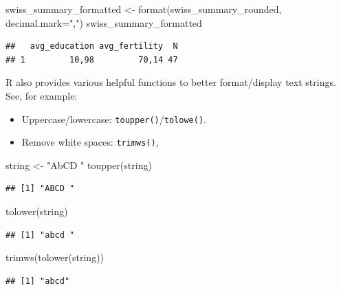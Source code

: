 \documentclass[
  12pt,
]{style/krantz}
\newenvironment{Shaded}{\begin{snugshade}}{\end{snugshade}}
\newcommand{\AttributeTok}[1]{\textcolor[rgb]{0.77,0.63,0.00}{#1}}
\newcommand{\FunctionTok}[1]{\textcolor[rgb]{0.00,0.00,0.00}{#1}}
\newcommand{\NormalTok}[1]{#1}
\newcommand{\OtherTok}[1]{\textcolor[rgb]{0.56,0.35,0.01}{#1}}
\newcommand{\StringTok}[1]{\textcolor[rgb]{0.31,0.60,0.02}{#1}}
\providecommand{\tightlist}{%
  \setlength{\itemsep}{0pt}\setlength{\parskip}{0pt}}
\begin{document}
\begin{Shaded}
\begin{Highlighting}[]
\NormalTok{swiss\_summary\_formatted }\OtherTok{\textless{}{-}} \FunctionTok{format}\NormalTok{(swiss\_summary\_rounded, }\AttributeTok{decimal.mark=}\StringTok{","}\NormalTok{)}
\NormalTok{swiss\_summary\_formatted }
\end{Highlighting}
\end{Shaded}

\begin{verbatim}
##   avg_education avg_fertility  N
## 1         10,98         70,14 47
\end{verbatim}

R also provides various helpful functions to better format/display text strings. See, for example:

\begin{itemize}
\tightlist
\item
  Uppercase/lowercase: \texttt{toupper()}/\texttt{tolowe()}.
\item
  Remove white spaces: \texttt{trimws()},
\end{itemize}

\begin{Shaded}
\begin{Highlighting}[]
\NormalTok{string }\OtherTok{\textless{}{-}} \StringTok{"AbCD "}
\FunctionTok{toupper}\NormalTok{(string)}
\end{Highlighting}
\end{Shaded}

\begin{verbatim}
## [1] "ABCD "
\end{verbatim}

\begin{Shaded}
\begin{Highlighting}[]
\FunctionTok{tolower}\NormalTok{(string)}
\end{Highlighting}
\end{Shaded}

\begin{verbatim}
## [1] "abcd "
\end{verbatim}

\begin{Shaded}
\begin{Highlighting}[]
\FunctionTok{trimws}\NormalTok{(}\FunctionTok{tolower}\NormalTok{(string))}
\end{Highlighting}
\end{Shaded}

\begin{verbatim}
## [1] "abcd"
\end{verbatim}
\end{document}
